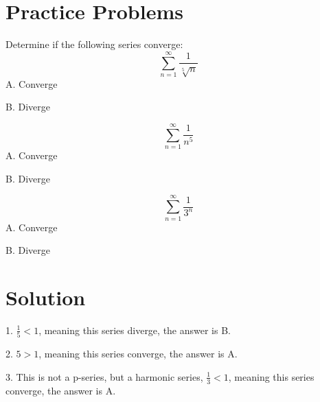 \documentclass{article}
\numberwithin{equation}{section}
\begin{document}
\section{Practice Problems}
Determine if the following series converge:
\[
\sum_{n=1}^{\infty} \frac{1}{\sqrt[5]{n}}
\]
A. Converge

B. Diverge 

\[
\sum_{n=1}^{\infty} \frac{1}{n^5}
\]
A. Converge

B. Diverge 

\[
\sum_{n=1}^{\infty} \frac{1}{3^n}
\]
A. Converge

B. Diverge 

\section{Solution}
1. $\displaystyle \frac{1}{5} < 1$, meaning this series diverge, the answer is B.

2. $\displaystyle 5>1$, meaning this series converge, the answer is A.

3. This is not a p-series, but a harmonic series, $\displaystyle \frac{1}{3} < 1$, meaning this series converge, the answer is A.
\end{document}
